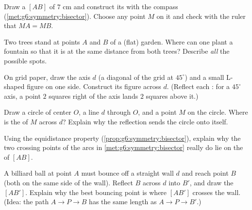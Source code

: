 \begin{exercise}[$\star$]\label{exo:g6:symmetry:7}
Draw a  $[AB]$ of $7$ cm and construct its  with the compass (\cref{met:g6:symmetry:bisector}). Choose any
point $M$ on it and check with the ruler that $MA = MB$.
\end{exercise}

\begin{exercise}[$\star\star$]\label{exo:g6:symmetry:8}
Two trees stand at points $A$ and $B$ of a (flat) garden. Where can one
plant a fountain so that it is at the same distance from both trees?
Describe \emph{all} the possible spots.
\end{exercise}

\begin{exercise}[$\star\star$]\label{exo:g6:symmetry:9}
On grid paper, draw the axis $d$ (a diagonal of the grid at
$45^\circ$) and a small L-shaped figure on one side. Construct its
 figure across $d$. (Reflect each : for a $45^\circ$
axis, a point $2$ squares right of the axis lands $2$ squares above
it.)
\end{exercise}

\begin{exercise}[$\star\star$]\label{exo:g6:symmetry:10}
Draw a circle of center $O$, a line $d$ through $O$, and a point $M$ on
the circle. Where is the  of $M$ across $d$? Explain why the
reflection sends the circle onto itself.
\end{exercise}

\begin{exercise}[$\star\star$]\label{exo:g6:symmetry:11}
Using the equidistance property (\cref{prop:g6:symmetry:bisector}),
explain why the two crossing points of the arcs in
\cref{met:g6:symmetry:bisector} really do lie on the  of $[AB]$.
\end{exercise}

\begin{exercise}[$\star\star\star$]\label{exo:g6:symmetry:12}
A billiard ball at point $A$ must bounce off a straight wall $d$ and
reach point $B$ (both on the same side of the wall). Reflect $B$
across $d$ into $B'$, and draw the  $[AB']$. Explain why the
best bouncing point is where $[AB']$ crosses the wall. (Idea: the path
$A \to P \to B$ has the same length as $A \to P \to B'$.)
\end{exercise}

